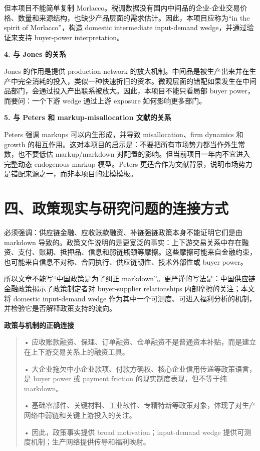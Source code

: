 \documentclass[
  12pt,
]{ctexart}
\begin{document}
但本项目不能简单复制 Morlacco。税调数据没有国内中间品的企业-企业交易价格、数量和来源结构，也缺少产品层面的需求估计。因此，本项目应称为``in the spirit of Morlacco''，构造 domestic intermediate input-demand wedge，并通过验证来支持 buyer-power interpretation。

\textbf{4. 与 Jones 的关系}

Jones 的作用是提供 production network 的放大机制。中间品是被生产出来并在生产中完全消耗的投入，类似一种快速折旧的资本。微观层面的错配如果发生在中间品部门，会通过投入产出联系被放大。因此，本项目不能只看局部 buyer power，而要问：一个下游 wedge 通过上游 exposure 如何影响更多部门。

\textbf{5. 与 Peters 和 markup-misallocation 文献的关系}

Peters 强调 markups 可以内生形成，并导致 misallocation、firm dynamics 和 growth 的相互作用。这对本项目的启示是：不要把所有市场势力都当作外生常数，也不要低估 markup/markdown 对配置的影响。但当前项目一年内不宜进入完整动态 endogenous markup 模型。Peters 更适合作为文献背景，说明市场势力是错配来源之一，而非本项目的建模模板。

\section{四、政策现实与研究问题的连接方式}\label{ux56dbux653fux7b56ux73b0ux5b9eux4e0eux7814ux7a76ux95eeux9898ux7684ux8fdeux63a5ux65b9ux5f0f}

必须强调：供应链金融、应收账款融资、补链强链政策本身不能证明它们是由 markdown 导致的。政策文件说明的是更宽泛的事实：上下游交易关系中存在融资、支付、账期、抵押品、信息和弱链瓶颈等摩擦。这些摩擦可能来自金融约束，也可能来自信息不对称、合同执行、供应链韧性、技术外部性或 buyer power。

所以文章不能写``中国政策是为了纠正 markdown''。更严谨的写法是：中国供应链金融政策揭示了政策制定者对 buyer-supplier relationships 内部摩擦的关注；本文将 domestic input-demand wedge 作为其中一个可测度、可进入福利分析的机制，并检验它是否解释政策支持的流向。

\textbf{政策与机制的正确连接}

\begin{quote}
• 应收账款融资、保理、订单融资、仓单融资不是普通资本补贴，而是建立在上下游交易关系上的融资工具。

• 大企业拖欠中小企业款项、付款方确权、核心企业信用传递等政策语言，是 buyer power 或 payment friction 的现实制度表现，但不等于纯 markdown。

• 基础零部件、关键材料、工业软件、专精特新等政策对象，体现了对生产网络中弱链和关键上游投入的关注。

• 因此，政策事实提供 broad motivation；input-demand wedge 提供可测度机制；生产网络提供传导和福利映射。
\end{quote}
\end{document}

